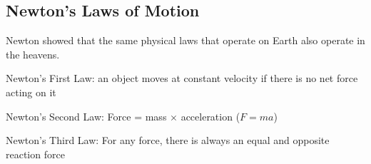 \documentclass[12pt]{article}
\begin{document}
\subsection{Newton's Laws of Motion} 
Newton showed that the same physical laws that operate on Earth also operate in the heavens. 
\begin{definition} Newton's First Law: an object moves at constant velocity if there is no net force acting on it \end{definition} 
\begin{definition} Newton's Second Law: Force = mass $\times$ acceleration ($F = ma$) \end{definition} 
\begin{definition} Newton's Third Law: For any force, there is always an equal and opposite reaction force \end{definition} 
\end{document}
